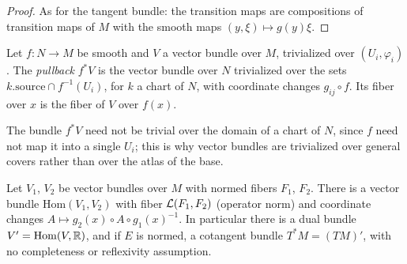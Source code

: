 \begin{proof}
  \leanok
  As for the tangent bundle: the transition maps are compositions of transition maps of $M$ with
  the smooth maps $(y, \xi) \mapsto g(y)\xi$.
\end{proof}

\begin{definition}
  \label{def:pullback-bundle}
  \leanok
  Let $f \colon N \to M$ be smooth and $V$ a vector bundle over $M$, trivialized over
  $(U_i, \varphi_i)$. The \emph{pullback} $f^*V$ is the vector bundle over $N$ trivialized over the
  sets $k.\mathrm{source} \cap f^{-1}(U_i)$, for $k$ a chart of $N$, with coordinate changes
  $g_{ij} \circ f$. Its fiber over $x$ is the fiber of $V$ over $f(x)$.
\end{definition}

The bundle $f^*V$ need not be trivial over the domain of a chart of $N$, since $f$ need not map
it into a single $U_i$; this is why vector bundles are trivialized over general covers rather
than over the atlas of the base.

\begin{theorem}
  \label{thm:hom-bundle}
  \leanok
  Let $V_1$, $V_2$ be vector bundles over $M$ with normed fibers $F_1$, $F_2$. There is a vector
  bundle $\mathrm{Hom}(V_1, V_2)$ with fiber $\mathcal{L}(F_1, F_2)$ (operator norm) and coordinate
  changes $A \mapsto g_2(x) \circ A \circ g_1(x)^{-1}$. In particular there is a dual bundle
  $V' = \mathrm{Hom}(V, \mathbb{R})$, and if $E$ is normed, a cotangent bundle $T^*M = (TM)'$, with
  no completeness or reflexivity assumption.
\end{theorem}

